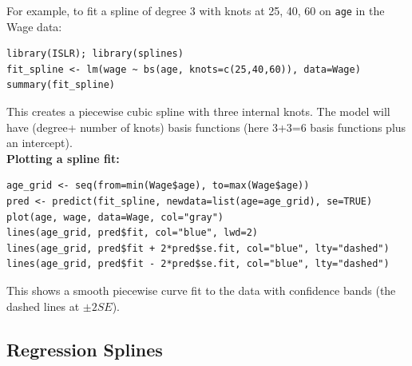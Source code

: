 \documentclass[11pt]{article}
\begin{document}
\noindent For example, to fit a spline of degree 3 with knots at 25, 40, 60 on \texttt{age} in the Wage data:
\begin{verbatim}
library(ISLR); library(splines)
fit_spline <- lm(wage ~ bs(age, knots=c(25,40,60)), data=Wage)
summary(fit_spline)
\end{verbatim}
\noindent This creates a piecewise cubic spline with three internal knots. The model will have (degree+ number of knots) basis functions (here 3+3=6 basis functions plus an intercept). \\

\noindent \textbf{Plotting a spline fit:}
\begin{verbatim}
age_grid <- seq(from=min(Wage$age), to=max(Wage$age))
pred <- predict(fit_spline, newdata=list(age=age_grid), se=TRUE)
plot(age, wage, data=Wage, col="gray")
lines(age_grid, pred$fit, col="blue", lwd=2)
lines(age_grid, pred$fit + 2*pred$se.fit, col="blue", lty="dashed")
lines(age_grid, pred$fit - 2*pred$se.fit, col="blue", lty="dashed")
\end{verbatim}
\noindent This shows a smooth piecewise curve fit to the data with confidence bands (the dashed lines at $\pm 2 SE$).

\subsection{Regression Splines}
\end{document}
